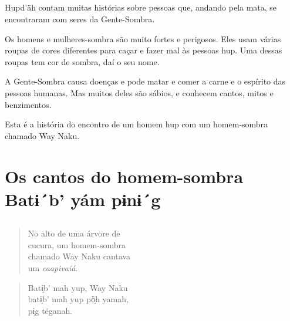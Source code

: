 \chapter*{}
\thispagestyle{empty}

\vspace*{\fill}
 Hupd'äh contam muitas histórias sobre pessoas que, andando pela mata, se
encontraram com seres da Gente-Sombra.

Os homens e mulheres-sombra são muito fortes e perigosos. Eles usam várias roupas de cores diferentes para caçar e fazer mal às pessoas hup. Uma dessas roupas tem cor de sombra,
daí o seu nome.

A Gente-Sombra causa doenças e pode matar e comer a carne e o espírito das pessoas humanas. Mas muitos deles são sábios, e conhecem cantos, mitos e benzimentos.

Esta é a história do encontro de um homem hup com um homem-sombra chamado Way Naku.
\vspace*{\fill}

\openany%

\blankpage
\part[Os cantos do homem-sombra]{Os cantos do homem-sombra\\Batɨ´b’ yám pɨnɨ´g}


\chapter*{}

\mbox{}\vspace*{\fill}

\begin{verse}
No alto de uma árvore de\\
cucura, um homem-sombra\\
chamado Way Naku cantava\\
um \textit{caapivaiá}.
\end{verse}

\begin{verse}
Batɨ̗b’ mah yup, Way Naku\\
batɨ̗b’ mah yup pö̗h yamah,\\
pɨ̗g tëganah.
\end{verse}

\vspace*{\fill}

\blankpage

